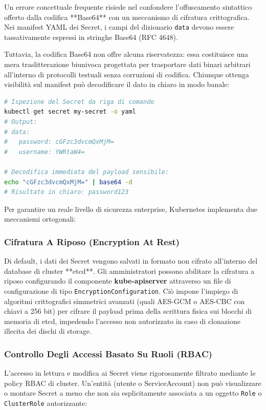 \documentclass[11pt, a4paper]{article}
\begin{document}
Un errore concettuale frequente risiede nel confondere l'offuscamento sintattico offerto dalla codifica **Base64** con un meccanismo di cifratura crittografica. Nei manifest YAML dei Secret, i campi del dizionario \texttt{data} devono essere tassativamente espressi in stringhe Base64 (RFC 4648).

Tuttavia, la codifica Base64 non offre alcuna riservatezza: essa costituisce una mera traslitterazione biunivoca progettata per trasportare dati binari arbitrari all'interno di protocolli testuali senza corruzioni di codifica. Chiunque ottenga visibilità sul manifest può decodificare il dato in chiaro in modo banale:

\begin{lstlisting}[language=bash]
# Ispezione del Secret da riga di comando
kubectl get secret my-secret -o yaml
# Output:
# data:
#   password: cGFzc3dvcmQxMjM=
#   username: YWRtaW4=

# Decodifica immediata del payload sensibile:
echo "cGFzc3dvcmQxMjM=" | base64 -d
# Risultato in chiaro: password123
\end{lstlisting}

Per garantire un reale livello di sicurezza enterprise, Kubernetes implementa due meccanismi ortogonali:

\subsubsection{Cifratura A Riposo (Encryption At Rest)}
Di default, i dati dei Secret vengono salvati in formato non cifrato all'interno del database di cluster **etcd**. Gli amministratori possono abilitare la cifratura a riposo configurando il componente \textbf{kube-apiserver} attraverso un file di configurazione di tipo \texttt{EncryptionConfiguration}. Ciò impone l'impiego di algoritmi crittografici simmetrici avanzati (quali AES-GCM o AES-CBC con chiavi a 256 bit) per cifrare il payload prima della scrittura fisica sui blocchi di memoria di etcd, impedendo l'accesso non autorizzato in caso di clonazione illecita dei dischi di storage.

\subsubsection{Controllo Degli Accessi Basato Su Ruoli (RBAC)}
L'accesso in lettura e modifica ai Secret viene rigorosamente filtrato mediante le policy RBAC di cluster. Un'entità (utente o ServiceAccount) non può visualizzare o montare Secret a meno che non sia esplicitamente associata a un oggetto \texttt{Role} o \texttt{ClusterRole} autorizzante:
\end{document}

